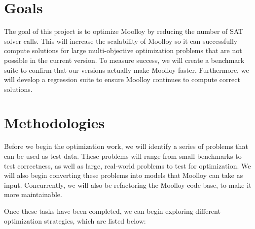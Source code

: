 \documentclass[11pt]{article}
\begin{document}
\section{Goals}\label{sec:goals}
The goal of this project is to optimize Moolloy by reducing the number
of SAT solver calls. This will increase the scalability of Moolloy so
it can successfully compute solutions for large multi-objective
optimization problems that are not possible in the current version.
To measure success, we will create a benchmark suite to confirm that
our versions actually make Moolloy faster. Furthermore, we will develop
a regression suite to ensure Moolloy continues to compute correct
solutions.

\section{Methodologies}\label{sec:methodologies}
Before we begin the optimization work, we will identify a series of
problems that can be used as test data. These problems will range from
small benchmarks to test correctness, as well as large, real-world
problems to test for optimization. We will also begin converting these
problems into models that Moolloy can take as input. Concurrently, we
will also be refactoring the Moolloy code base, to make it more
maintainable.

Once these tasks have been completed, we can begin exploring different
optimization strategies, which are listed below:
\end{document}
